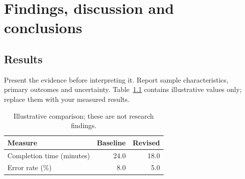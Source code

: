 \chapter{Findings, discussion and conclusions}
\label{ch:findings}
\section{Results}
Present the evidence before interpreting it. Report sample characteristics,
primary outcomes and uncertainty. Table~\ref{tab:outcomes} contains illustrative
values only; replace them with your measured results.
\begin{table}[htbp]
\centering
\caption{Illustrative comparison; these are not research findings.}
\label{tab:outcomes}
\begin{tabularx}{\linewidth}{@{}Xrr@{}}
\toprule
\textbf{Measure} & \textbf{Baseline} & \textbf{Revised}\\
\midrule
Completion time (minutes) & 24.0 & 18.0\\
Error rate (\%) & 8.0 & 5.0\\
\bottomrule
\end{tabularx}
\end{table}
